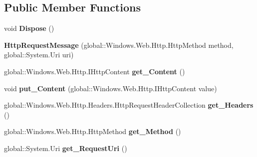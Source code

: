 \subsection*{Public Member Functions}
\begin{DoxyCompactItemize}
\item 
\mbox{\label{class_windows_1_1_web_1_1_http_1_1_http_request_message_a45b7a3697d6f36e790546f21c5011670}} 
void {\bfseries Dispose} ()
\item 
\mbox{\label{class_windows_1_1_web_1_1_http_1_1_http_request_message_a59606adfc5f01047a058c7802520488d}} 
{\bfseries Http\+Request\+Message} (global\+::\+Windows.\+Web.\+Http.\+Http\+Method method, global\+::\+System.\+Uri uri)
\item 
\mbox{\label{class_windows_1_1_web_1_1_http_1_1_http_request_message_a2d95b5c161ea61544f6c82430b9bef3d}} 
global\+::\+Windows.\+Web.\+Http.\+I\+Http\+Content {\bfseries get\+\_\+\+Content} ()
\item 
\mbox{\label{class_windows_1_1_web_1_1_http_1_1_http_request_message_aef2c0a57c9fe364d410c4ea568aa1406}} 
void {\bfseries put\+\_\+\+Content} (global\+::\+Windows.\+Web.\+Http.\+I\+Http\+Content value)
\item 
\mbox{\label{class_windows_1_1_web_1_1_http_1_1_http_request_message_a7954249df0daf81ada6573d24a237db8}} 
global\+::\+Windows.\+Web.\+Http.\+Headers.\+Http\+Request\+Header\+Collection {\bfseries get\+\_\+\+Headers} ()
\item 
\mbox{\label{class_windows_1_1_web_1_1_http_1_1_http_request_message_a4e6485899f5654f598f0911225702f86}} 
global\+::\+Windows.\+Web.\+Http.\+Http\+Method {\bfseries get\+\_\+\+Method} ()
\item 
\mbox{\label{class_windows_1_1_web_1_1_http_1_1_http_request_message_a60eee69978be3f99e85a37b7bf05850d}} 
global\+::\+System.\+Uri {\bfseries get\+\_\+\+Request\+Uri} ()

\end{DoxyCompactItemize}
